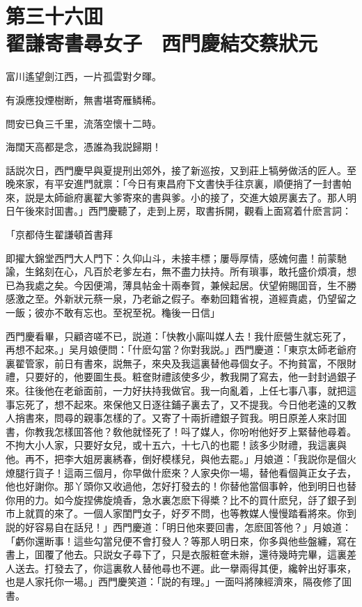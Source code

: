 
\chapter*{第三十六囬　\\翟謙寄書尋女子　西門慶結交蔡狀元}


\begin{myquote}
富川遙望劍江西，一片孤雲對夕暉。

有淚應投煙樹断，無書堪寄雁鳞稀。

問安已負三千里，流落空懷十二時。

海闊天高都是念，憑誰為我説歸期！
\end{myquote}

話説次日，西門慶早與夏提刑出郊外，接了新巡按，又到莊上犒勞做活的匠人。至晚來家，有平安進門就禀：「今日有東昌府下文書快手往京裏，順便捎了一封書帕來，説是太師爺府裏翟大爹寄來的書與爹。小的接了，交進大娘房裏去了。那人明日午後來討囬書。」西門慶聽了，走到上房，取書拆開，觀看上面寫着什麽言詞：

\begin{myquote}[\markfont]
\hspace*{4em}「京都侍生翟謙頓首書拜

即擢大錦堂西門大人門下：久仰山斗，未接丰標；屢辱厚情，感媿何盡！前蒙馳諭，生銘刻在心，凡百於老爹左右，無不盡力扶持。所有瑣事，敢托盛价煩凟，想已為我處之矣。今因便鴻，薄具帖金十兩奉賀，兼候起居。伏望俯賜囬音，生不勝感激之至。外新狀元蔡一泉，乃老爺之假子。奉勅回籍省視，道經貴處，仍望留之一飯；彼亦不敢有忘也。至祝至祝。龝後一日信」
\end{myquote}

西門慶看畢，只顧咨嗟不已，説道：「快教小廝叫媒人去！我什麽營生就忘死了，再想不起來。」吴月娘便問：「什麽勾當？你對我説。」西門慶道：「東京太師老爺府裏翟管家，前日有書來，説無子，來央及我這裏替他尋個女子。不拘貧富，不限財禮，只要好的，他要圖生長。粧奩財禮該使多少，教我開了寫去，他一封封過銀子來。往後他在老爺面前，一力好扶持我做官。我一向亂着，上任七事八事，就把這事忘死了，想不起來。來保他又日逐往鋪子裏去了，又不提我。今日他老遠的又教人捎書來，問尋的親事怎樣的了。又寄了十兩折禮銀子賀我。明日原差人來討囬書，你教我怎樣囬答他？敎他就怪死了！呌了媒人，你吩咐他好歹上緊替他尋着。不拘大小人家，只要好女兒，或十五六，十七八的也罷！該多少財禮，我這裏與他。再不，把李大姐房裏綉春，倒好模樣兒，與他去罷。」月娘道：「我説你是個火燎腿行貨子！這兩三個月，你早做什麽來？人家央你一場，替他看個眞正女子去，他也好謝你。那丫頭你又收過他，怎好打發去的！你替他當個事幹，他到明日也替你用的力。如今旋捏佛旋燒香，急水裏怎麽下得槳？比不的買什麽兒，㧱了銀子到市上就買的來了。一個人家閨門女子，好歹不問，也等教媒人慢慢踏看將來。你到説的好容易自在話兒！」西門慶道：「明日他來要回書，怎麽囬答他？」月娘道：「虧你還断事！這些勾當兒便不會打發人？等那人明日來，你多與他些盤纏，寫在書上，囬覆了他去。只説女子尋下了，只是衣服粧奩未辦，還待幾時完畢，這裏差人送去。打發去了，你這裏敎人替他尋也不遲。此一擧兩得其便，纔幹出好事來，也是人家托你一場。」西門慶笑道：「説的有理。」一面呌將陳經濟來，隔夜修了囬書。

